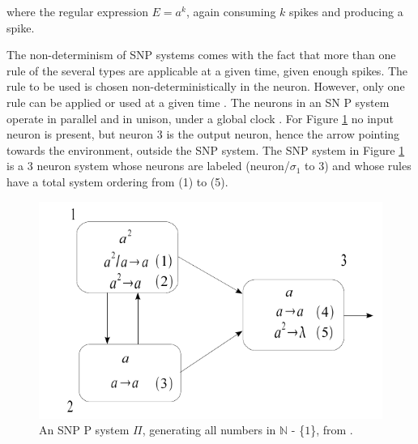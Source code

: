 \documentclass{acm_proc_article-sp}
\begin{document}
where the regular expression $E = a^k$, again consuming $k$ spikes and producing a spike.

The non-determinism of SNP systems comes with the fact
that more than one rule of the several types are applicable at
a given time, given enough spikes. The rule to be used is
chosen non-deterministically in the neuron. However, only
one rule can be applied or used at a given time \cite{snp}\cite{snpbrain}\cite{snpmat}. The
neurons in an SN P system operate in parallel and in unison,
under a global clock \cite{snp}. For Figure \ref{snp_ex} no input neuron is present,
but neuron 3 is the output neuron, hence the arrow pointing
towards the environment, outside the SNP system. The SNP system in Figure \ref{snp_ex} is a 3 neuron system whose neurons are labeled (neuron/$\sigma_1$ to 3) and whose rules have a total system ordering from (1) to (5).


	\begin{figure}
		\centering
		\includegraphics[scale=.35]{snp-img.png} 
		\caption{An SNP P system $\Pi$, generating all numbers in $\mathbb N$ - \{$1$\}, from \cite{snpmat}.}
		\label{snp_ex}
	\end{figure}



\end{document}
